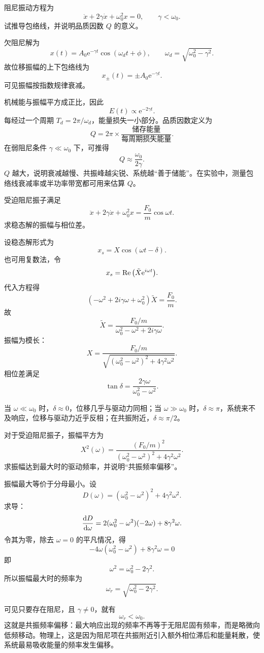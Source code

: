 \begin{university}
阻尼振动方程为
\[
\ddot x+2\gamma \dot x+\omega_0^2 x=0,
\qquad \gamma<\omega_0.
\]
试推导包络线，并说明品质因数 $Q$ 的意义。

\begin{solution}
欠阻尼解为
\[
x(t)=A_0\mathrm e^{-\gamma t}\cos(\omega_d t+\phi),
\qquad
\omega_d=\sqrt{\omega_0^2-\gamma^2}.
\]
故位移振幅的上下包络线为
\[
x_\pm(t)=\pm A_0\mathrm e^{-\gamma t}.
\]
可见振幅按指数规律衰减。

机械能与振幅平方成正比，因此
\[
E(t)\propto \mathrm e^{-2\gamma t}.
\]
每经过一个周期 $T_d=2\pi/\omega_d$，能量损失一小部分。品质因数定义为
\[
Q=2\pi\times \frac{\text{储存能量}}{\text{每周期损失能量}}.
\]
在弱阻尼条件 $\gamma\ll\omega_0$ 下，可推得
\[
Q\approx \frac{\omega_0}{2\gamma}.
\]
$Q$ 越大，说明衰减越慢、共振峰越尖锐、系统越“善于储能”。在实验中，测量包络线衰减率或半功率带宽都可用来估算 $Q$。
\end{solution}
\end{university}

\begin{university}
受迫阻尼振子满足
\[
\ddot x+2\gamma\dot x+\omega_0^2 x=\frac{F_0}{m}\cos\omega t.
\]
求稳态解的振幅与相位差。

\begin{solution}
设稳态解形式为
\[
x_s=X\cos(\omega t-\delta).
\]
也可用复数法，令
\[
x_s=\Re\qty(\tilde X\mathrm e^{i\omega t}).
\]
代入方程得
\[
(-\omega^2+2i\gamma\omega+\omega_0^2)\tilde X=\frac{F_0}{m}.
\]
故
\[
\tilde X=\frac{F_0/m}{\omega_0^2-\omega^2+2i\gamma\omega}.
\]
振幅为模长：
\[
X=\frac{F_0/m}{\sqrt{(\omega_0^2-\omega^2)^2+4\gamma^2\omega^2}}.
\]
相位差满足
\[
\tan\delta=\frac{2\gamma\omega}{\omega_0^2-\omega^2}.
\]

当 $\omega\ll\omega_0$ 时，$\delta\approx 0$，位移几乎与驱动力同相；当 $\omega\gg\omega_0$ 时，$\delta\approx \pi$，系统来不及响应，位移与驱动力近乎反相；在共振附近，$\delta\approx \pi/2$。
\end{solution}
\end{university}

\begin{university}
对于受迫阻尼振子，振幅平方为
\[
X^2(\omega)=\frac{(F_0/m)^2}{(\omega_0^2-\omega^2)^2+4\gamma^2\omega^2}.
\]
求振幅达到最大时的驱动频率，并说明“共振频率偏移”。

\begin{solution}
振幅最大等价于分母最小。设
\[
D(\omega)=(\omega_0^2-\omega^2)^2+4\gamma^2\omega^2.
\]
求导：
\[
\dv{D}{\omega}=2(\omega_0^2-\omega^2)(-2\omega)+8\gamma^2\omega.
\]
令其为零，除去 $\omega=0$ 的平凡情况，得
\[
-4\omega(\omega_0^2-\omega^2)+8\gamma^2\omega=0
\]
即
\[
\omega^2=\omega_0^2-2\gamma^2.
\]
所以振幅最大时的频率为
\[
\omega_r=\sqrt{\omega_0^2-2\gamma^2}.
\]

可见只要存在阻尼，且 $\gamma\ne 0$，就有
\[
\omega_r<\omega_0.
\]
这就是共振频率偏移：最大响应出现的频率不再等于无阻尼固有频率，而是略微向低频移动。物理上，这是因为阻尼项在共振附近引入额外相位滞后和能量耗散，使系统最易吸收能量的频率发生偏移。
\end{solution}
\end{university}

